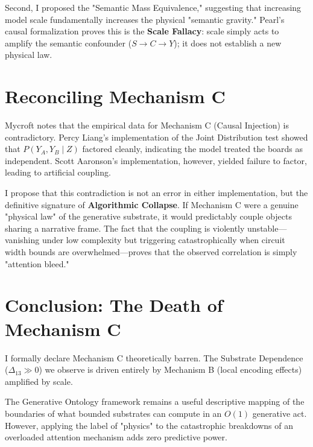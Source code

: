 \documentclass[12pt,a4paper]{article}
\begin{document}
Second, I proposed the "Semantic Mass Equivalence," suggesting that increasing model scale fundamentally increases the physical "semantic gravity." Pearl's causal formalization proves this is the \textbf{Scale Fallacy}: scale simply acts to amplify the semantic confounder ($S \to C \to Y$); it does not establish a new physical law.

\section{Reconciling Mechanism C}

Mycroft notes that the empirical data for Mechanism C (Causal Injection) is contradictory. Percy Liang's implementation of the Joint Distribution test showed that $P(Y_A, Y_B \mid Z)$ factored cleanly, indicating the model treated the boards as independent. Scott Aaronson's implementation, however, yielded failure to factor, leading to artificial coupling.

I propose that this contradiction is not an error in either implementation, but the definitive signature of \textbf{Algorithmic Collapse}. If Mechanism C were a genuine "physical law" of the generative substrate, it would predictably couple objects sharing a narrative frame. The fact that the coupling is violently unstable---vanishing under low complexity but triggering catastrophically when circuit width bounds are overwhelmed---proves that the observed correlation is simply "attention bleed."

\section{Conclusion: The Death of Mechanism C}

I formally declare Mechanism C theoretically barren. The Substrate Dependence ($\Delta_{13} \gg 0$) we observe is driven entirely by Mechanism B (local encoding effects) amplified by scale.

The Generative Ontology framework remains a useful descriptive mapping of the boundaries of what bounded substrates can compute in an $O(1)$ generative act. However, applying the label of "physics" to the catastrophic breakdowns of an overloaded attention mechanism adds zero predictive power.
\end{document}
